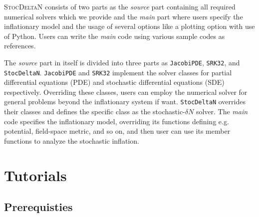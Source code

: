 \documentclass[aps, prd
, preprint
, nofootinbib 
, notitlepage
, superscriptaddress
, longbibliography
]{revtex4-1}
\begin{document}
\textsc{StocDeltaN} consists of two parts as the \emph{source} part containing all required numerical solvers which we provide and the \emph{main} part where users specify the inflationary model
and the usage of several options like a plotting option with use of Python. Users can write the \emph{main} code using various sample codes as references.

The \emph{source} part in itself is divided into three parts as \texttt{JacobiPDE}, \texttt{SRK32}, and \texttt{StocDeltaN}.
\texttt{JacobiPDE} and \texttt{SRK32} implement the solver classes for partial differential equations (PDE) and stochastic differential equations (SDE) respectively.
Overriding these classes, users can employ the numerical solver for general problems beyond the inflationary system if want.
\texttt{StocDeltaN} overrides their classes and defines the specific class as the stochastic-$\delta N$ solver.
The \emph{main} code specifies the inflationary model, overriding its functions defining e.g. potential, field-space metric, and so on,
and then user can use its member functions to analyze the stochastic inflation.

\newpage


\section{Tutorials}

\subsection{Prerequisties}
\end{document}
